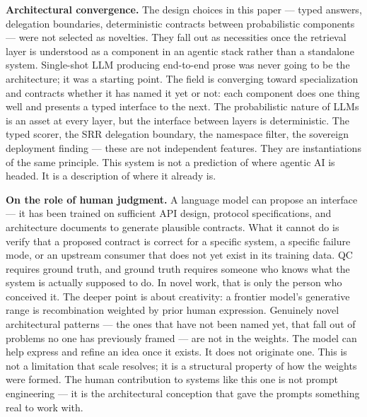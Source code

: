 \textbf{Architectural convergence.} The design choices in this paper --- typed answers, delegation boundaries, deterministic contracts between probabilistic components --- were not selected as novelties. They fall out as necessities once the retrieval layer is understood as a component in an agentic stack rather than a standalone system. Single-shot LLM producing end-to-end prose was never going to be the architecture; it was a starting point. The field is converging toward specialization and contracts whether it has named it yet or not: each component does one thing well and presents a typed interface to the next. The probabilistic nature of LLMs is an asset at every layer, but the interface between layers is deterministic. The typed scorer, the SRR delegation boundary, the namespace filter, the sovereign deployment finding --- these are not independent features. They are instantiations of the same principle. This system is not a prediction of where agentic AI is headed. It is a description of where it already is.

\textbf{On the role of human judgment.} A language model can propose an interface --- it has been trained on sufficient API design, protocol specifications, and architecture documents to generate plausible contracts. What it cannot do is verify that a proposed contract is correct for a specific system, a specific failure mode, or an upstream consumer that does not yet exist in its training data. QC requires ground truth, and ground truth requires someone who knows what the system is actually supposed to do. In novel work, that is only the person who conceived it. The deeper point is about creativity: a frontier model's generative range is recombination weighted by prior human expression. Genuinely novel architectural patterns --- the ones that have not been named yet, that fall out of problems no one has previously framed --- are not in the weights. The model can help express and refine an idea once it exists. It does not originate one. This is not a limitation that scale resolves; it is a structural property of how the weights were formed. The human contribution to systems like this one is not prompt engineering --- it is the architectural conception that gave the prompts something real to work with.

